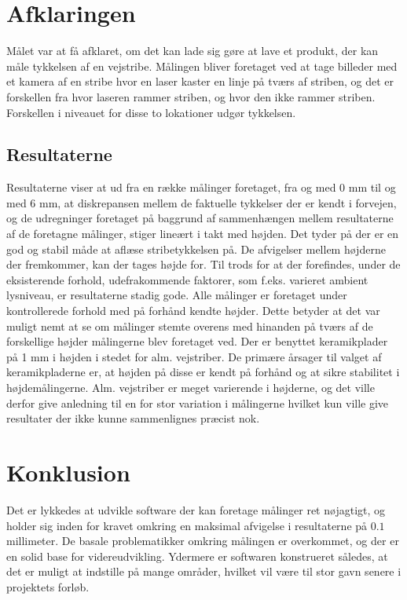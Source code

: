 \section{Afklaringen}
Målet var at få afklaret, om det kan lade sig gøre at lave et produkt, der kan måle tykkelsen af en vejstribe.
Målingen bliver foretaget ved at tage billeder med et kamera af en stribe hvor en laser kaster en linje på tværs af striben, og det er forskellen fra hvor laseren rammer striben, og hvor den ikke rammer striben. Forskellen i niveauet for disse to lokationer udgør tykkelsen.

\subsection{Resultaterne}
Resultaterne viser at ud fra en række målinger foretaget, fra og med 0 mm til og med 6 mm, at diskrepansen mellem de faktuelle tykkelser der er kendt i forvejen, og de udregninger foretaget på baggrund af sammenhængen mellem resultaterne af de foretagne målinger, stiger lineært i takt med højden.
Det tyder på der er en god og stabil måde at aflæse stribetykkelsen på. De afvigelser mellem højderne der fremkommer, kan der tages højde for. Til trods for at der forefindes, under de eksisterende forhold, udefrakommende faktorer, som f.eks. varieret ambient lysniveau, er resultaterne stadig gode. Alle målinger er foretaget under kontrollerede forhold med på forhånd kendte højder. Dette betyder at det var muligt nemt at se om målinger stemte overens med hinanden på tværs af de forskellige højder målingerne blev foretaget ved.
Der er benyttet keramikplader på 1 mm i højden i stedet for alm. vejstriber. De primære årsager til valget af keramikpladerne er, at højden på disse er kendt på forhånd og at sikre stabilitet i højdemålingerne. Alm. vejstriber er meget varierende i højderne, og det ville derfor give anledning til en for stor variation i målingerne hvilket kun ville give resultater der ikke kunne sammenlignes præcist nok.

\section{Konklusion}
Det er lykkedes at udvikle software der kan foretage målinger ret nøjagtigt, og holder sig inden for kravet omkring en maksimal afvigelse i resultaterne på $0.1$ millimeter. De basale problematikker omkring målingen er overkommet, og der er en solid base for videreudvikling. Ydermere er softwaren konstrueret således, at det er muligt at indstille på mange områder, hvilket vil være til stor gavn senere i projektets forløb.


